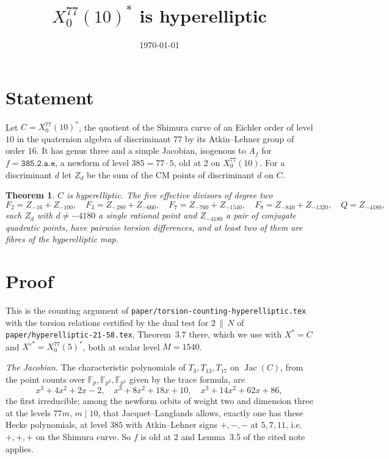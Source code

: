\documentclass[11pt,reqno]{amsart}
\theoremstyle{plain}
\newtheorem{theorem}{Theorem}[section]
\theoremstyle{definition}
\DeclareMathOperator{\Jac}{Jac}
\newcommand{\F}{\mathbb{F}}
\begin{document}
\title{$X_0^{77}(10)^*$ is hyperelliptic}
\author{}
\date{\today}
\maketitle

\section{Statement}

Let $C=X_0^{77}(10)^*$, the quotient of the Shimura curve of an Eichler order of level $10$ in the
quaternion algebra of discriminant $77$ by its Atkin--Lehner group of order $16$. It has genus three
and a simple Jacobian, isogenous to $A_f$ for $f=\texttt{385.2.a.e}$, a newform of level $385=77\cdot5$,
old at $2$ on $X_0^{77}(10)$. For a discriminant $d$ let $Z_d$ be the sum of the CM points of
discriminant $d$ on $C$.

\begin{theorem}\label{thm:main}
$C$ is hyperelliptic. The five effective divisors of degree two
\[
F_2=Z_{-16}+Z_{-100},\quad F_3=Z_{-280}+Z_{-660},\quad F_7=Z_{-760}+Z_{-1540},\quad
F_8=Z_{-840}+Z_{-1320},\quad Q=Z_{-4180},
\]
each $Z_d$ with $d\neq-4180$ a single rational point and $Z_{-4180}$ a pair of conjugate quadratic
points, have pairwise torsion differences, and at least two of them are fibres of the hyperelliptic
map.
\end{theorem}

\section{Proof}

This is the counting argument of \texttt{paper/torsion-counting-hyperelliptic.tex} with the torsion
relations certified by the dual test for $2\,\|\,N$ of \texttt{paper/hyperelliptic-21-58.tex},
Theorem~3.7 there, which we use with $X^*=C$ and $X'^*=X_0^{77}(5)^*$, both at scalar level
$M=1540$.

\emph{The Jacobian.} The characteristic polynomials of $T_3,T_{13},T_{17}$ on $\Jac(C)$, from the
point counts over $\F_p,\F_{p^2},\F_{p^3}$ given by the trace formula, are
\[
x^3+4x^2+2x-2,\quad x^3+8x^2+18x+10,\quad x^3+14x^2+62x+86,
\]
the first irreducible; among the newform orbits of weight two and dimension three at the levels
$77m$, $m\mid10$, that Jacquet--Langlands allows, exactly one has these Hecke polynomials, at level
$385$ with Atkin--Lehner signs $+,-,-$ at $5,7,11$, i.e.\ $+,+,+$ on the Shimura curve. So $f$ is
old at $2$ and Lemma~3.5 of the cited note applies.
\end{document}
